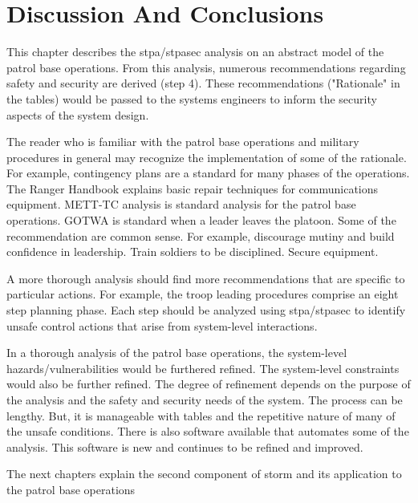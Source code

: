 \documentclass[../../main/main.tex]{subfiles}
\begin{document}
\section{Discussion And Conclusions}\label{chp:stpapb:discuss}
This chapter describes the \gls{stpa}/\gls{stpasec} analysis on an abstract model of the patrol base operations.  From this analysis, numerous recommendations regarding safety and security are derived (step 4).  These recommendations ("Rationale" in the tables) would be passed to the systems engineers to inform the security aspects of the system design.  

The reader who is familiar with the patrol base operations and military procedures in general may recognize the implementation of some of the rationale.  For example, contingency plans are a standard for many phases of the operations.  The Ranger Handbook explains basic repair techniques for communications equipment.   METT-TC analysis is standard analysis for the patrol base operations.  GOTWA is standard when a leader leaves the platoon.  Some of the recommendation are common sense.  For example, discourage mutiny and build confidence in leadership.  Train soldiers to be disciplined.  Secure equipment. 

A more thorough analysis should find more recommendations that are specific to particular actions.  For example, the troop leading procedures comprise an eight step planning phase.  Each step should be analyzed using \gls{stpa}/\gls{stpasec} to identify unsafe control actions that arise from system-level interactions.  

In a thorough analysis of the patrol base operations, the system-level hazards/vulnerabilities would be furthered refined.  The system-level constraints would also be further refined.  The degree of refinement depends on the purpose of the analysis and the safety and security needs of the system.  The process can be lengthy.  But, it is manageable with tables and the repetitive nature of many of the unsafe conditions.  There is also software available that automates some of the analysis.  This software is new and continues to be refined and improved.  


The next chapters explain the second component of \gls{storm} and its application to the patrol base operations
\end{document}
